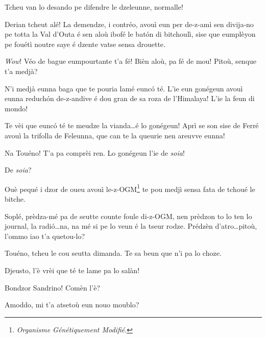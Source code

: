 \begin{drama}
\Tuenospeaks{} Tcheu van lo desando pe difendre le dzeleunne, normalle!

\Gerominespeaks Derian tcheut alé! La demendze, i contréo, avouì eun per de-z-amì sen divija-no pe totta la Val d'Outa é sen aloù ibofé le bat\'on di bitchoulì, sise que eumplèyon pe fouétì noutre saye é dzente vatse sensa drouette.

\Tuenospeaks {} \textit{Wow}! Véo de bague eumpourtante t'a fé! Bièn aloù, pa fé de mou! Pitoù, senque t'a medjà? 

\Gerominespeaks N'i medjà eunna baga que te pouria lamé eunc\'o té. L'ie eun gonégeun avouì eunna reduch\'on de-z-andive é dou gran de sa roza de l'Himalaya! L'ie la feun di mondo!

\Tuenospeaks Te vèi que eunc\'o té te meudze la vianda\ldots é lo gonégeun! Aprì se son sise de Ferré avouì la trifolla de Feleunna, que can te la queurie nen areuvve eunna!

\Gerominespeaks Na Touéno! T'a pa comprèi ren. Lo gonégeun l'ie de \textit{soia}!

\Tuenospeaks De \textit{soia}?

\Gerominespeaks Ouè pequé i dzor de oueu avouì le-z-OGM\footnote{ \textit{Organisme Génétiquement Modifié}.} te pou medjì sensa fata de tchoué le bitche.

\Tuenospeaks{} Soplé, prèdza-mé pa de seutte counte foule di-z-OGM, nen prèdzon to lo ten lo journal, la radi\'o\ldots na, na mé si pe lo veun é la tseur rodze. Prédzèn d'atro\ldots pitoù, l’ommo iao t'a quetou-lo?

\Gerominespeaks{} Touéno, tcheu le cou seutta dimanda. Te sa beun que n'i pa lo choze.

\Tuenospeaks Djeusto, l'è vrèi que té te lame pa lo salàn! 





\Richardspeaks Bondzor Sandrino! Comèn l'è?

\Sandrinospeaks Amoddo, mi t'a atsetoù eun nouo moublo?


\end{drama}

